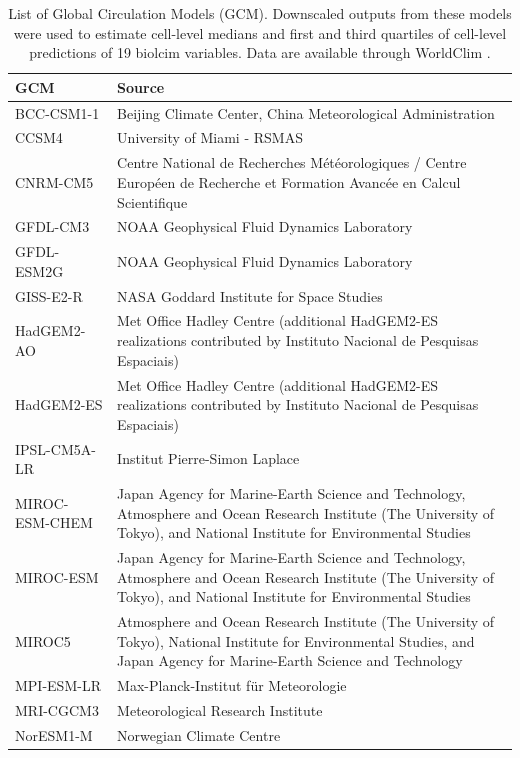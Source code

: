 \documentclass[titlesmallcaps,copyrightpage]{uomthesis}\usepackage[]{graphicx}\usepackage[]{color}
\begin{document}
\begin{table}[htb]
\centering
\caption{List of Global Circulation Models (GCM). Downscaled outputs from these models were used to estimate cell-level medians and first and third quartiles of cell-level predictions of 19 biolcim variables. Data are available through WorldClim \citep{hijmans_worldclim_nodate}.}
\label{apx:ch2:tab2}
\begin{tabularx}{\textwidth}{@{}l Y@{}}
\toprule
GCM & Source \\ \toprule
BCC-CSM1-1 & Beijing Climate Center, China Meteorological Administration \\
CCSM4 & University of Miami - RSMAS \\
CNRM-CM5 & Centre National de Recherches Météorologiques / Centre Européen de Recherche et Formation Avancée en Calcul Scientifique \\
GFDL-CM3 & NOAA Geophysical Fluid Dynamics Laboratory \\
GFDL-ESM2G & NOAA Geophysical Fluid Dynamics Laboratory \\
GISS-E2-R & NASA Goddard Institute for Space Studies \\
HadGEM2-AO & Met Office Hadley Centre (additional HadGEM2-ES realizations contributed by Instituto Nacional de Pesquisas Espaciais) \\
HadGEM2-ES & Met Office Hadley Centre (additional HadGEM2-ES realizations contributed by Instituto Nacional de Pesquisas Espaciais) \\
IPSL-CM5A-LR & Institut Pierre-Simon Laplace \\
MIROC-ESM-CHEM & Japan Agency for Marine-Earth Science and Technology, Atmosphere and Ocean Research Institute (The University of Tokyo), and National Institute for Environmental Studies \\
MIROC-ESM & Japan Agency for Marine-Earth Science and Technology, Atmosphere and Ocean Research Institute (The University of Tokyo), and National Institute for Environmental Studies \\
MIROC5 & Atmosphere and Ocean Research Institute (The University of Tokyo), National Institute for Environmental Studies, and Japan Agency for Marine-Earth Science and Technology \\
MPI-ESM-LR & Max-Planck-Institut für Meteorologie \\
MRI-CGCM3 & Meteorological Research Institute \\
NorESM1-M & Norwegian Climate Centre \\ \toprule
\end{tabularx}
\end{table}
\end{document}
